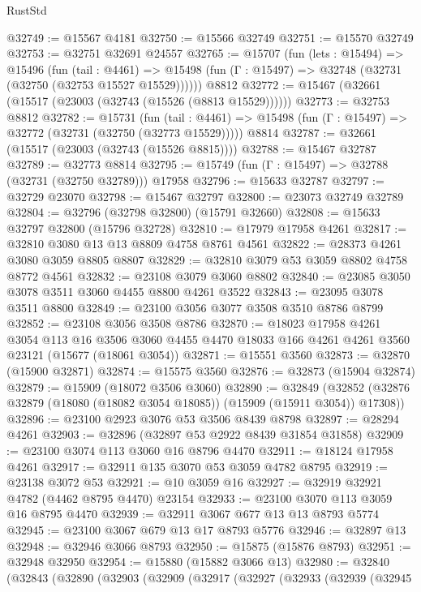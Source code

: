 \begin{lexlean}{RustStd}
\begin{coremodule}
@32749 := @15567 @4181
@32750 := @15566 @32749
@32751 := @15570 @32749
@32753 := @32751 @32691 @24557
@32765 := @15707
    (fun (lets : @15494) =>
    @15496
      (fun (tail : @4461) =>
      @15498 (fun (Γ : @15497) => @32748 (@32731 (@32750 (@32753 @15527 @15529))))))
    @8812
@32772 := @15467 (@32661 (@15517 (@23003 (@32743 (@15526 (@8813 @15529))))))
@32773 := @32753 @8812
@32782 := @15731
    (fun (tail : @4461) => @15498 (fun (Γ : @15497) => @32772 (@32731 (@32750 (@32773 @15529)))))
    @8814
@32787 := @32661 (@15517 (@23003 (@32743 (@15526 @8815))))
@32788 := @15467 @32787
@32789 := @32773 @8814
@32795 := @15749 (fun (Γ : @15497) => @32788 (@32731 (@32750 @32789))) @17958
@32796 := @15633 @32787
@32797 := @32729 @23070
@32798 := @15467 @32797
@32800 := @23073 @32749 @32789
@32804 := @32796 (@32798 @32800) (@15791 @32660)
@32808 := @15633 @32797 @32800 (@15796 @32728)
@32810 := @17979 @17958 @4261
@32817 := @32810 @3080 @13 @13 @8809 @4758 @8761 @4561
@32822 := @28373 @4261 @3080 @3059 @8805 @8807
@32829 := @32810 @3079 @53 @3059 @8802 @4758 @8772 @4561
@32832 := @23108 @3079 @3060 @8802
@32840 := @23085 @3050 @3078 @3511 @3060 @4455 @8800 @4261 @3522
@32843 := @23095 @3078 @3511 @8800
@32849 := @23100 @3056 @3077 @3508 @3510 @8786 @8799
@32852 := @23108 @3056 @3508 @8786
@32870 := @18023
    @17958
    @4261
    @3054
    @113
    @16
    @3506
    @3060
    @4455
    @4470
    @18033
    @166
    @4261
    @4261
    @3560
    @23121
    (@15677 (@18061 @3054))
@32871 := @15551 @3560
@32873 := @32870 (@15900 @32871)
@32874 := @15575 @3560
@32876 := @32873 (@15904 @32874)
@32879 := @15909 (@18072 @3506 @3060)
@32890 := @32849
    (@32852 (@32876 @32879 (@18080 (@18082 @3054 @18085)) (@15909 (@15911 @3054)) @17308))
@32896 := @23100 @2923 @3076 @53 @3506 @8439 @8798
@32897 := @28294 @4261
@32903 := @32896 (@32897 @53 @2922 @8439 @31854 @31858)
@32909 := @23100 @3074 @113 @3060 @16 @8796 @4470
@32911 := @18124 @17958 @4261
@32917 := @32911 @135 @3070 @53 @3059 @4782 @8795
@32919 := @23138 @3072 @53
@32921 := @10 @3059 @16
@32927 := @32919 @32921 @4782 (@4462 @8795 @4470) @23154
@32933 := @23100 @3070 @113 @3059 @16 @8795 @4470
@32939 := @32911 @3067 @677 @13 @13 @8793 @5774
@32945 := @23100 @3067 @679 @13 @17 @8793 @5776
@32946 := @32897 @13
@32948 := @32946 @3066 @8793
@32950 := @15875 (@15876 @8793)
@32951 := @32948 @32950
@32954 := @15880 (@15882 @3066 @13)
@32980 := @32840
    (@32843
      (@32890
        (@32903
          (@32909
            (@32917
              (@32927
                (@32933
                  (@32939
                    (@32945

\end{coremodule}
\end{lexlean}

